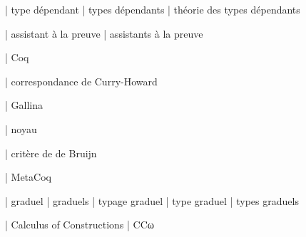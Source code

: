 

  | type dépendant
  | types dépendants
  | théorie des types dépendants

  | assistant à la preuve
  | assistants à la preuve

  | Coq

  | correspondance de Curry-Howard

  | Gallina

  | noyau

  | critère de de Bruijn

  | MetaCoq

  | graduel
  | graduels
  | typage graduel
  | type graduel
  | types graduels

  | Calculus of Constructions
  | CCω